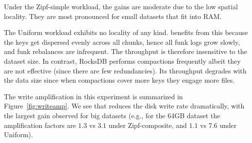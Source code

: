  Under the Zipf-simple workload, the gains are moderate due to the low spatial locality. They are most pronounced 
 for small datasets that fit into RAM.
 
The Uniform workload exhibits no locality of any kind. 
 \sys\/ benefits from this because the keys get dispersed evenly across all chunks, hence all funk logs grow 
 slowly, and funk rebalances are infrequent. The throughput is therefore insensitive to the dataset 
 size. In contrast, RocksDB performs compactions frequently albeit they are not effective (since there are few redundancies). Its throughput 
 degrades  with the data size since when compactions cover more keys they engage more files.
 
   
The write amplification in this experiment is summarized in 
Figure~\ref{fig:writeamp}. We see that \sys\/ reduces the disk write rate dramatically, 
with the largest gain observed for big datasets (e.g.,  for the 64GB dataset 
the amplification factors are $1.3$ vs $3.1$ under Zipf-composite, and $1.1$ vs $7.6$ under Uniform). 


